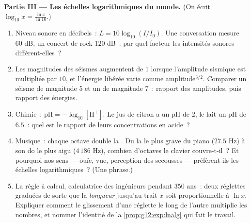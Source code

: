 \begin{problem}
\medskip
\noindent\textbf{Partie III --- Les échelles logarithmiques du
monde.}
(On écrit $\log_{10} x = \frac{\ln x}{\ln 10}$.)
\begin{enumerate}[resume]
  \item Niveau sonore en décibels~: $L = 10 \log_{10}(I/I_0)$. Une
        conversation mesure $60$ dB, un concert de rock $120$ dB~:
        par quel facteur les intensités sonores diffèrent-elles~?
  \item Les magnitudes des séismes augmentent de $1$ lorsque
        l'amplitude sismique est multipliée par $10$, et l'énergie
        libérée varie comme amplitude$^{3/2}$. Comparer un séisme de
        magnitude $5$ et un de magnitude $7$~: rapport des
        amplitudes, puis rapport des énergies.
  \item Chimie~: $\text{pH} = -\log_{10}[\mathrm{H^+}]$. Le jus de
        citron a un pH de $2$, le lait un pH de $6.5$~: quel est le
        rapport de leurs concentrations en acide~?
  \item Musique~: chaque octave double la . Du la le plus
        grave du piano ($27.5$ Hz) à son do le plus aigu
        ($4\,186$ Hz), combien d'octaves le clavier couvre-t-il~? Et
        pourquoi nos sens --- ouïe, vue, perception des secousses
        --- préfèrent-ils les échelles logarithmiques~? (Une
        phrase.)
  \item La règle à calcul, calculatrice des ingénieurs pendant
        $350$ ans~: deux réglettes graduées de sorte que la
        \emph{longueur} jusqu'au trait $x$ soit proportionnelle à
        $\ln x$. Expliquer comment le glissement d'une réglette le
        long de l'autre multiplie les nombres, et nommer l'identité
        de la \cref{prop:g12:exp:lnalg} qui fait le travail.
\end{enumerate}


\end{problem}
